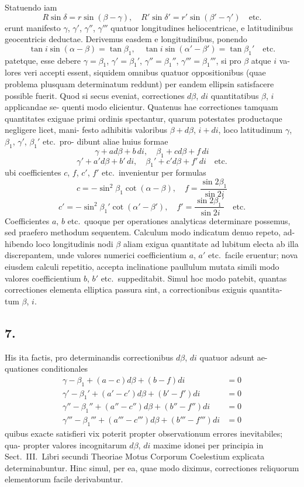\documentclass[12pt,a4paper]{article}
\begin{document}
Statuendo iam
\[
R\sin\delta = r\sin(\beta - \gamma), \quad
R'\sin\delta' = r'\sin(\beta' - \gamma') \quad \text{etc.}
\]
erunt manifesto $\gamma$, $\gamma'$, $\gamma''$, $\gamma'''$ quatuor longitudines heliocentricae, e latitudinibus
geocentricis deductae. Derivemus easdem e longitudinibus, ponendo
\[
\tan i \sin(\alpha - \beta) = \tan\beta_1, \quad
\tan i \sin(\alpha' - \beta') = \tan\beta_1' \quad \text{etc.}
\]
patetque, esse debere $\gamma = \beta_1$, $\gamma' = \beta_1'$, $\gamma'' = \beta_1''$, $\gamma''' = \beta_1'''$, si pro $\beta$ atque $i$ va-
lores veri accepti essent, siquidem omnibus quatuor oppositionibus (quae problema
plusquam determinatum reddunt) per eandem ellipsin satisfacere possible fuerit.
Quod si secus eveniat, correctiones $d\beta$, $di$ quantitatibus $\beta$, $i$ applicandae se-
quenti modo elicientur. Quatenus hae correctiones tamquam quantitates exiguae
primi ordinis spectantur, quarum potestates productaque negligere licet, mani-
festo adhibitis valoribus $\beta + d\beta$, $i + di$, loco latitudinum $\gamma$, $\beta_1$, $\gamma'$, $\beta_1'$ etc.\ pro-
dibunt aliae huius formae
\[
\gamma + ad\beta + b \, di, \quad \beta_1 + cd\beta + f \, di
\]
\[
\gamma' + a'd\beta + b'\,di, \quad \beta_1' + c'd\beta + f'\,di \quad \text{etc.}
\]
ubi coefficientes $c$, $f$, $c'$, $f'$ etc.\ invenientur per formulas
\[
c = -\sin^2\beta_1 \cot(\alpha - \beta), \quad f = \frac{\sin 2\beta_1}{\sin 2i}
\]
\[
c' = -\sin^2\beta_1' \cot(\alpha' - \beta'), \quad f' = \frac{\sin 2\beta_1'}{\sin 2i} \quad \text{etc.}
\]
Coefficientes $a$, $b$ etc.\ quoque per operationes analyticas determinare possemus,
sed praefero methodum sequentem. Calculum modo indicatum denuo repeto, ad-
hibendo loco longitudinis nodi $\beta$ aliam exigua quantitate ad lubitum electa ab
illa discrepantem, unde valores numerici coefficientium $a$, $a'$ etc.\ facile eruentur;
nova eiusdem calculi repetitio, accepta inclinatione paullulum mutata simili modo
valores coefficientium $b$, $b'$ etc.\ suppeditabit. Simul hoc modo patebit, quantas
correctiones elementa elliptica passura sint, a correctionibus exiguis quantita-
tum $\beta$, $i$.

\subsection*{7.}

His ita factis, pro determinandis correctionibus $d\beta$, $di$ quatuor adsunt ae-
quationes conditionales
\begin{align*}
\gamma - \beta_1 + (a - c)d\beta + (b - f)di &= 0 \\
\gamma' - \beta_1' + (a' - c')d\beta + (b' - f')di &= 0 \\
\gamma'' - \beta_1'' + (a'' - c'')d\beta + (b'' - f'')di &= 0 \\
\gamma''' - \beta_1''' + (a''' - c''')d\beta + (b''' - f''')di &= 0
\end{align*}
quibus exacte satisfieri vix poterit propter observationum errores inevitabiles; qua-
propter valores incognitarum $d\beta$, $di$ maxime idonei per principia in Sect.~III.\ Libri secundi Theoriae Motus Corporum Coelestium explicata determinabuntur.
Hinc simul, per ea, quae modo diximus, correctiones reliquorum elementorum
facile derivabuntur.
\end{document}
